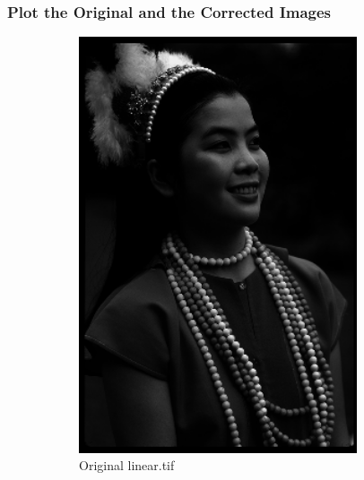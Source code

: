\documentclass{article}
\begin{document}
	\subsubsection{Plot the Original and the Corrected Images}
		\begin{figure}[h]
			\begin{subfigure}{0.5\textwidth}
				\includegraphics[width=0.9\textwidth]{linear.png}
				\caption{Original linear.tif}
			\end{subfigure}
			\begin{subfigure}{0.5\textwidth}

\end{subfigure}
\end{figure}
\end{document}
